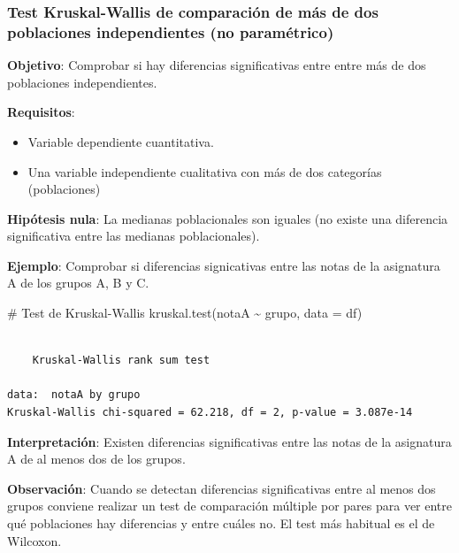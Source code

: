 \documentclass[
  a4paper,
]{scrreport}
\newenvironment{Shaded}{\begin{snugshade}}{\end{snugshade}}
\newcommand{\AttributeTok}[1]{\textcolor[rgb]{0.40,0.45,0.13}{#1}}
\newcommand{\CommentTok}[1]{\textcolor[rgb]{0.37,0.37,0.37}{#1}}
\newcommand{\FunctionTok}[1]{\textcolor[rgb]{0.28,0.35,0.67}{#1}}
\newcommand{\NormalTok}[1]{\textcolor[rgb]{0.00,0.23,0.31}{#1}}
\newcommand{\SpecialCharTok}[1]{\textcolor[rgb]{0.37,0.37,0.37}{#1}}
\providecommand{\tightlist}{%
  \setlength{\itemsep}{0pt}\setlength{\parskip}{0pt}}\usepackage{longtable,booktabs,array}
\theoremstyle{definition}
\theoremstyle{definition}
\theoremstyle{remark}
\begin{document}
\subsubsection{Test Kruskal-Wallis de comparación de más de dos
poblaciones independientes (no
paramétrico)}\label{test-kruskal-wallis-de-comparaciuxf3n-de-muxe1s-de-dos-poblaciones-independientes-no-paramuxe9trico}

\textbf{Objetivo}: Comprobar si hay diferencias significativas entre
entre más de dos poblaciones independientes.

\textbf{Requisitos}:

\begin{itemize}
\tightlist
\item
  Variable dependiente cuantitativa.
\item
  Una variable independiente cualitativa con más de dos categorías
  (poblaciones)
\end{itemize}

\textbf{Hipótesis nula}: La medianas poblacionales son iguales (no
existe una diferencia significativa entre las medianas poblacionales).

\textbf{Ejemplo}: Comprobar si diferencias signicativas entre las notas
de la asignatura A de los grupos A, B y C.

\begin{Shaded}
\begin{Highlighting}[]
\CommentTok{\# Test de Kruskal{-}Wallis}
\FunctionTok{kruskal.test}\NormalTok{(notaA }\SpecialCharTok{\textasciitilde{}}\NormalTok{ grupo, }\AttributeTok{data =}\NormalTok{ df)}
\end{Highlighting}
\end{Shaded}

\begin{verbatim}

    Kruskal-Wallis rank sum test

data:  notaA by grupo
Kruskal-Wallis chi-squared = 62.218, df = 2, p-value = 3.087e-14
\end{verbatim}

\textbf{Interpretación}: Existen diferencias significativas entre las
notas de la asignatura A de al menos dos de los grupos.

\textbf{Observación}: Cuando se detectan diferencias significativas
entre al menos dos grupos conviene realizar un test de comparación
múltiple por pares para ver entre qué poblaciones hay diferencias y
entre cuáles no. El test más habitual es el de Wilcoxon.
\end{document}
